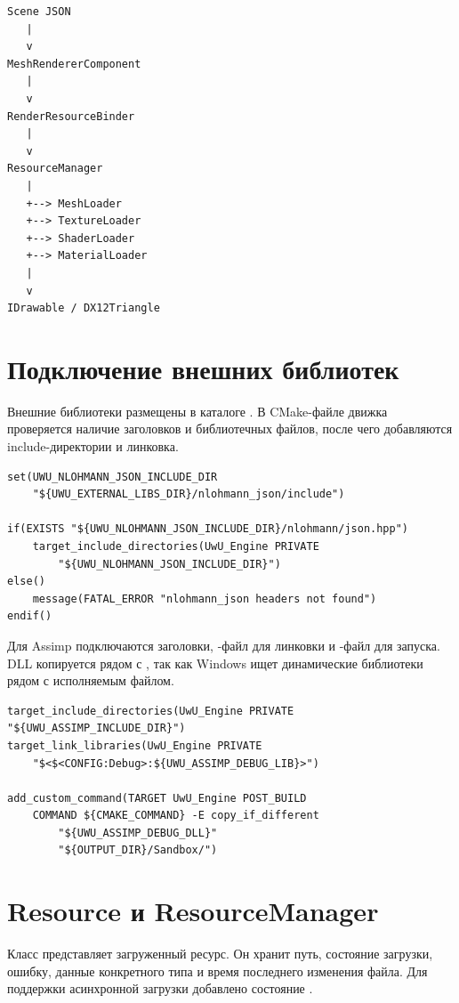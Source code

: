 \documentclass[14pt,a4paper]{extarticle}
\begin{document}
\begin{verbatim}
Scene JSON
   |
   v
MeshRendererComponent
   |
   v
RenderResourceBinder
   |
   v
ResourceManager
   |
   +--> MeshLoader
   +--> TextureLoader
   +--> ShaderLoader
   +--> MaterialLoader
   |
   v
IDrawable / DX12Triangle
\end{verbatim}

\section{Подключение внешних библиотек}

Внешние библиотеки размещены в каталоге . В CMake-файле движка проверяется наличие
заголовков и библиотечных файлов, после чего добавляются include-директории и линковка.

\begin{lstlisting}[style=cppgost,caption={Подключение nlohmann/json в CMake}]
set(UWU_NLOHMANN_JSON_INCLUDE_DIR
    "${UWU_EXTERNAL_LIBS_DIR}/nlohmann_json/include")

if(EXISTS "${UWU_NLOHMANN_JSON_INCLUDE_DIR}/nlohmann/json.hpp")
    target_include_directories(UwU_Engine PRIVATE
        "${UWU_NLOHMANN_JSON_INCLUDE_DIR}")
else()
    message(FATAL_ERROR "nlohmann_json headers not found")
endif()
\end{lstlisting}

Для Assimp подключаются заголовки, -файл для линковки и -файл для запуска.
DLL копируется рядом с , так как Windows ищет динамические библиотеки рядом с
исполняемым файлом.

\begin{lstlisting}[style=cppgost,caption={Подключение Assimp}]
target_include_directories(UwU_Engine PRIVATE "${UWU_ASSIMP_INCLUDE_DIR}")
target_link_libraries(UwU_Engine PRIVATE
    "$<$<CONFIG:Debug>:${UWU_ASSIMP_DEBUG_LIB}>")

add_custom_command(TARGET UwU_Engine POST_BUILD
    COMMAND ${CMAKE_COMMAND} -E copy_if_different
        "${UWU_ASSIMP_DEBUG_DLL}"
        "${OUTPUT_DIR}/Sandbox/")
\end{lstlisting}

\section{Resource и ResourceManager}

Класс  представляет загруженный ресурс. Он хранит путь, состояние загрузки, ошибку,
данные конкретного типа и время последнего изменения файла. Для поддержки асинхронной загрузки добавлено
состояние .
\end{document}
